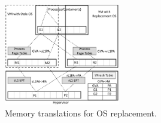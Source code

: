 \begin{figure}[t!]
 	  \includegraphics[width=0.45\textwidth]{figures/vfresh-table-container.pdf}
  \caption{Memory translations for OS replacement.}
  \label{fig:mappingc}
  \vspace{0.2in}
\end{figure}






    

